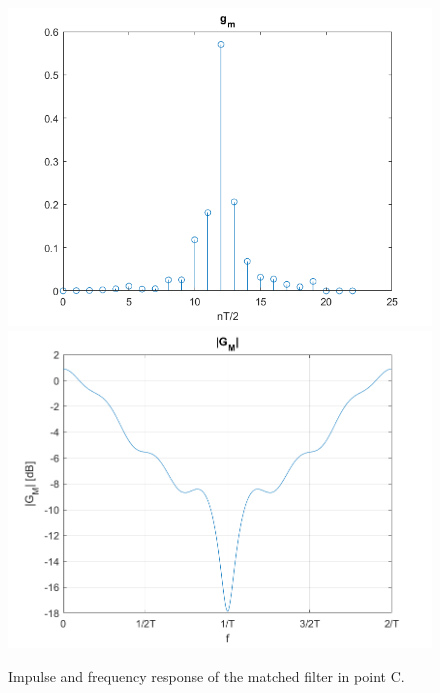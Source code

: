 \documentclass[a4paper,11.5pt]{article}
\begin{document}
\begin{figure}[H]
	\begin{center}   
		\includegraphics[width=\textwidth]{figs/C_gm.png} 
		\includegraphics[width=\textwidth]{figs/GM_CD.png}
		\caption{Impulse and frequency response of the matched filter in point C.}
		\label{fig:C_gm}
	\end{center}
\end{figure}
\end{document}
